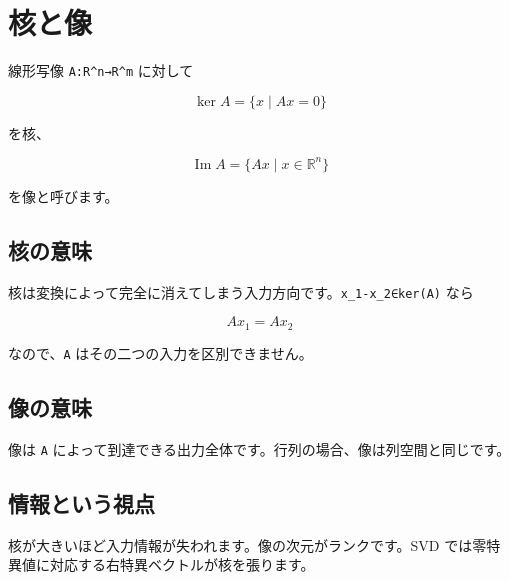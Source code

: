 \documentclass[
  11pt,
  a4paper,
]{ltjsarticle}
\author{}
\date{}
\begin{document}
\hypertarget{ux6838ux3068ux50cf}{%
\section{核と像}\label{ux6838ux3068ux50cf}}

線形写像 \texttt{A:R\^{}n→R\^{}m} に対して

\[
\ker A=\{x\mid Ax=0\}
\]

を核、

\[
\operatorname{Im}A=\{Ax\mid x\in\mathbb{R}^n\}
\]

を像と呼びます。

\hypertarget{ux6838ux306eux610fux5473}{%
\subsection{核の意味}\label{ux6838ux306eux610fux5473}}

核は変換によって完全に消えてしまう入力方向です。\texttt{x\_1-x\_2∈ker(A)}
なら

\[
Ax_1=Ax_2
\]

なので、\texttt{A} はその二つの入力を区別できません。

\hypertarget{ux50cfux306eux610fux5473}{%
\subsection{像の意味}\label{ux50cfux306eux610fux5473}}

像は \texttt{A}
によって到達できる出力全体です。行列の場合、像は列空間と同じです。

\hypertarget{ux60c5ux5831ux3068ux3044ux3046ux8996ux70b9}{%
\subsection{情報という視点}\label{ux60c5ux5831ux3068ux3044ux3046ux8996ux70b9}}

核が大きいほど入力情報が失われます。像の次元がランクです。SVD
では零特異値に対応する右特異ベクトルが核を張ります。
\end{document}
